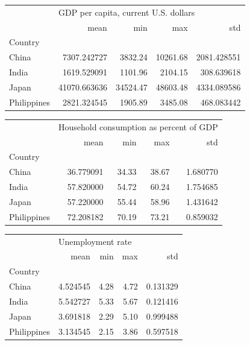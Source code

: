 \documentclass[11pt]{article}
\begin{document}
\begin{flushleft}
\begin{tabular}{lrrrr}
\toprule
{} & \multicolumn{4}{l}{GDP per capita, current U.S. dollars} \\
{} &                                 mean &       min &       max &          std \\
Country     &                                      &           &           &              \\
\midrule
China       &                          7307.242727 &   3832.24 &  10261.68 &  2081.428551 \\
India       &                          1619.529091 &   1101.96 &   2104.15 &   308.639618 \\
Japan       &                         41070.663636 &  34524.47 &  48603.48 &  4334.089586 \\
Philippines &                          2821.324545 &   1905.89 &   3485.08 &   468.083442 \\
\bottomrule
\end{tabular}

\vspace{2em}

\begin{tabular}{lrrrr}
\toprule
{} & \multicolumn{4}{l}{Household consumption as percent of GDP} \\
{} &                                    mean &    min &    max &       std \\
Country     &                                         &        &        &           \\
\midrule
China       &                               36.779091 &  34.33 &  38.67 &  1.680770 \\
India       &                               57.820000 &  54.72 &  60.24 &  1.754685 \\
Japan       &                               57.220000 &  55.44 &  58.96 &  1.431642 \\
Philippines &                               72.208182 &  70.19 &  73.21 &  0.859032 \\
\bottomrule
\end{tabular}

\vspace{2em}

\begin{tabular}{lrrrr}
\toprule
{} & \multicolumn{4}{l}{Unemployment rate} \\
{} &              mean &   min &   max &       std \\
Country     &                   &       &       &           \\
\midrule
China       &          4.524545 &  4.28 &  4.72 &  0.131329 \\
India       &          5.542727 &  5.33 &  5.67 &  0.121416 \\
Japan       &          3.691818 &  2.29 &  5.10 &  0.999488 \\
Philippines &          3.134545 &  2.15 &  3.86 &  0.597518 \\
\bottomrule
\end{tabular}


\end{flushleft}
\end{document}
